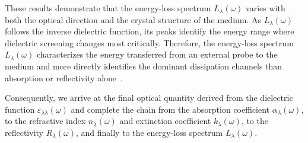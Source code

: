 These results demonstrate that the energy-loss spectrum $L_{\lambda}(\omega)$ varies with both the optical direction and the crystal structure of the medium.
As $L_{\lambda}(\omega)$ follows the inverse dielectric function,
its peaks identify the energy range where dielectric screening changes most critically.
Therefore, the energy-loss spectrum $L_{\lambda}(\omega)$ characterizes the energy transferred from an external probe to the medium and more directly identifies the dominant dissipation channels than absorption or reflectivity alone~\cite{niu2024electronic,khan2025insight,huang2023optical,suk2024ultrafast,cheng2025two,tang2025unveiling,leon2026momentum}.

Consequently, we arrive at the final optical quantity derived from the dielectric function $\varepsilon_{\lambda\lambda}(\omega)$ and complete the chain from the absorption coefficient $\alpha_{\lambda}(\omega)$,
to the refractive index $n_{\lambda}(\omega)$ and extinction coefficient $k_{\lambda}(\omega)$, to the reflectivity $R_{\lambda}(\omega)$, and finally to the energy-loss spectrum $L_{\lambda}(\omega)$.
